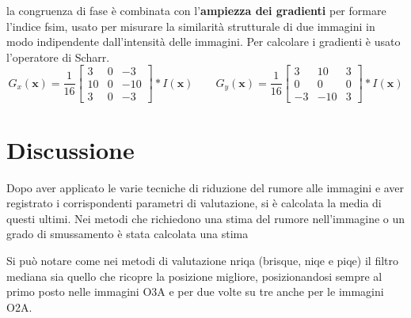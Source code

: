 \documentclass[../main.tex]{subfiles}
\begin{document}
la congruenza di fase è combinata con l'\textbf{ampiezza dei gradienti} per formare l'indice \acrshort{fsim}, usato per misurare la similarità strutturale di due immagini in modo indipendente dall'intensità delle immagini.\cite{zhang_2011} Per calcolare i gradienti è usato l'operatore di Scharr.\cite{jahne_1999}
\begin{equation}
	G_x(\mathbf{x}) = \frac{1}{16}\begin{bmatrix}
		3 & 0 & -3 \\
		10 & 0 & -10 \\
		3 & 0 & -3
	\end{bmatrix} * I(\mathbf{x}) \qquad
	G_y(\mathbf{x}) = \frac{1}{16}\begin{bmatrix}
		3 & 10 & 3 \\
		0 & 0 & 0 \\
		-3 & -10 & 3 
	\end{bmatrix} * I(\mathbf{x})
\end{equation}

\newpage

\section{Discussione}

Dopo aver applicato le varie tecniche di riduzione del rumore alle immagini e aver registrato i corrispondenti parametri di valutazione, si è calcolata la media di questi ultimi. Nei metodi che richiedono una stima del rumore nell'immagine o un grado di smussamento è stata calcolata una stima 

Si può notare come nei metodi di valutazione \acrshort{nriqa} (\acrshort{brisque}, \acrshort{niqe} e \acrshort{piqe}) il filtro mediana sia quello che ricopre la posizione migliore, posizionandosi sempre al primo posto nelle immagini O3A e per due volte su tre anche per le immagini O2A. 
\end{document}
